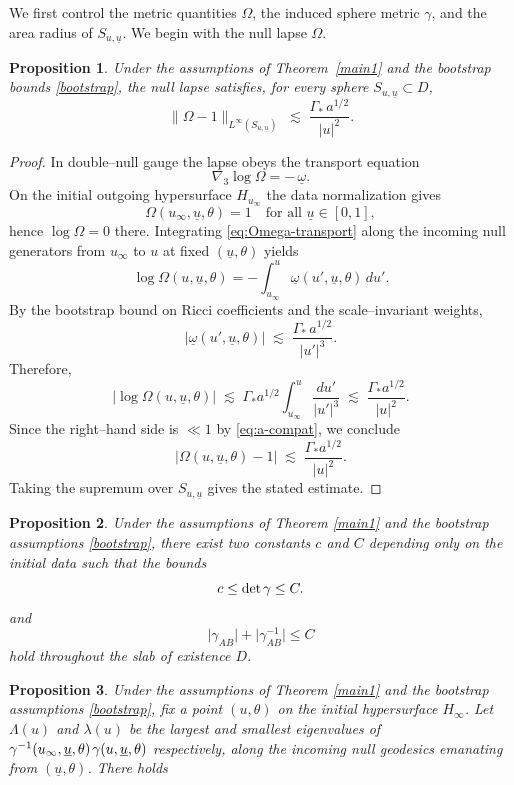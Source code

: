\documentclass{amsart}
\newtheorem{proposition}{Proposition}[section]
\newcommand{\hsp}{\hspace{.5mm}}
\newcommand{\ubar}{\underline{u}}
\begin{document}
{We first control the metric quantities $\Omega$, the induced sphere metric $\gamma$, and the area radius of $S_{u,\ubar}$. We begin with the null lapse $\Omega$.

\begin{proposition}\label{31}
Under the assumptions of Theorem~\ref{main1} and the bootstrap bounds
\eqref{bootstrap}, the null lapse satisfies, for every sphere $S_{u,\ubar}\subset D$,
\[
\|\Omega-1\|_{L^\infty(S_{u,\ubar})}
\;\lesssim\;
\frac{\Gamma_\ast\, a^{1/2}}{|u|^{2}}.
\]
\end{proposition}

\begin{proof}
In double–null gauge the lapse obeys the transport equation
\begin{equation}\label{eq:Omega-transport}
\nabla_3 \log \Omega = -\,\underline\omega.
\end{equation}
On the initial outgoing hypersurface $H_{u_\infty}$ the data normalization gives
\[
\Omega(u_\infty,\ubar,\theta)=1
\quad\text{for all }\ubar\in[0,1],
\]
hence $\log\Omega=0$ there. Integrating \eqref{eq:Omega-transport} along the
incoming null generators from $u_\infty$ to $u$ at fixed $(\ubar,\theta)$ yields
\[
\log\Omega(u,\ubar,\theta)
=
- \int_{u_\infty}^{u}
\underline\omega(u',\ubar,\theta)\,du'.
\]
By the bootstrap bound on Ricci coefficients and the scale–invariant weights,
\[
|\underline\omega(u',\ubar,\theta)|
\;\lesssim\;
\frac{\Gamma_\ast\, a^{1/2}}{|u'|^{3}}.
\]
Therefore,
\[
|\log\Omega(u,\ubar,\theta)|
\;\lesssim\;
\Gamma_\ast a^{1/2}
\int_{u_\infty}^{u}\frac{du'}{|u'|^{3}}
\;\lesssim\;
\frac{\Gamma_\ast a^{1/2}}{|u|^{2}}.
\]
Since the right–hand side is $\ll 1$ by \eqref{eq:a-compat}, we conclude
\[
|\Omega(u,\ubar,\theta)-1|
\;\lesssim\;
\frac{\Gamma_\ast a^{1/2}}{|u|^{2}}.
\]
Taking the supremum over $S_{u,\ubar}$ gives the stated estimate.
\end{proof}


\begin{proposition}
Under the assumptions of Theorem \ref{main1} and the bootstrap assumptions \eqref{bootstrap},  there exist two constants $c$ and $C$ depending only on the initial data such that the bounds 
\[ c \leq \text{det}\hsp \gamma \leq C.\]and \[  \lvert \gamma_{AB} \rvert + \lvert \gamma^{-1}_{AB}\rvert \leq C  \]hold throughout the slab of existence $D$.\label{32}
\end{proposition}

\begin{proposition}\label{33}
Under the assumptions of Theorem \ref{main1} and the bootstrap assumptions \eqref{bootstrap}, fix a point $(u, \theta)$ on the initial hypersurface $H_{\infty}$. Let $\Lambda(u)$ and $\lambda(u)$ be the largest and smallest eigenvalues of $\gamma^{-1}(u_{\infty},\ubar,\theta)\hsp \gamma(u,\ubar,\theta) $ respectively, along the incoming null geodesics emanating from $(\ubar,\theta)$. There holds 


\end{proposition}}
\end{document}
